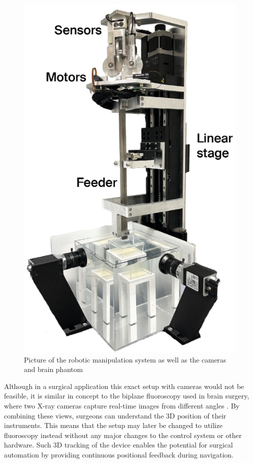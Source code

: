 \begin{figure} [H]
    \centering
    \includegraphics[width=0.5\linewidth]{images/Hardware/insertionStrategy.PNG}
    \caption{Picture of the robotic manipulation system as well as the cameras and brain phantom}
    \label{fig:roboticmanipulationsystem}
\end{figure}

Although in a surgical application this exact setup with cameras would not be feasible, it is similar in concept to the biplane fluoroscopy used in brain surgery, where two X-ray cameras capture real-time images from different angles \cite{weise_intraoperative_2012}. By combining these views, surgeons can understand the 3D position of their instruments. This means that the setup may later be changed to utilize fluoroscopy instead without any major changes to the control system or other hardware. Such 3D tracking of the device enables the potential for surgical automation by providing continuous positional feedback during navigation.

